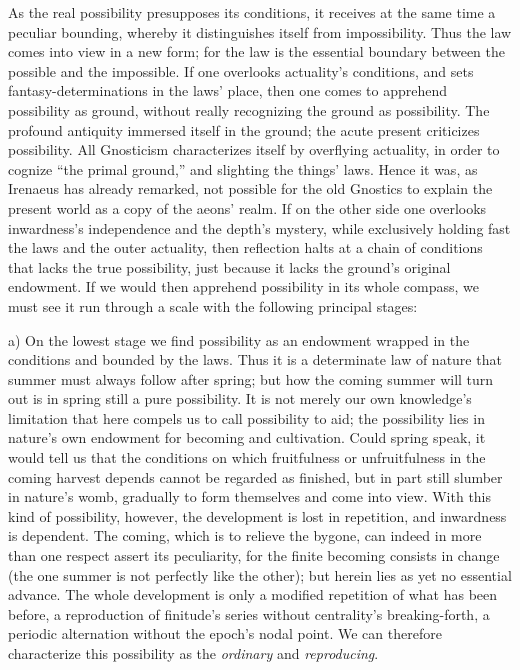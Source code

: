\documentclass[12pt]{book}
\begin{document}
As the real possibility presupposes its conditions, it receives at the same
time a peculiar bounding, whereby it distinguishes itself from
impossibility. Thus the law comes into view in a new form; for the law is
the essential boundary between the possible and the impossible. If one
overlooks actuality's conditions, and sets fantasy-determinations in the
laws' place, then one comes to apprehend possibility as ground, without
really recognizing the ground as possibility. The profound antiquity
immersed itself in the ground; the acute present criticizes possibility. All
Gnosticism characterizes itself by overflying actuality, in order to cognize
``the primal ground,'' and slighting the things' laws. Hence it was, as
Irenaeus has already remarked, not possible for the old Gnostics to explain
the present world as a copy of the aeons' realm. If on the other side one
overlooks inwardness's independence and the depth's mystery, while
exclusively holding fast the laws and the outer actuality, then reflection
halts at a chain of conditions that lacks the true possibility, just because
it lacks the ground's original endowment. If we would then apprehend
possibility in its whole compass, we must see it run through a scale with
the following principal stages:

a) On the lowest stage we find possibility as an endowment wrapped in the
conditions and bounded by the laws. Thus it is a determinate law of nature
that summer must always follow after spring; but how the coming summer will
turn out is in spring still a pure possibility. It is not merely our own
knowledge's limitation that here compels us to call possibility to aid; the
possibility lies in nature's own endowment for becoming and cultivation.
Could spring speak, it would tell us that the conditions on which
fruitfulness or unfruitfulness in the coming harvest depends cannot be
regarded as finished, but in part still slumber in nature's womb, gradually
to form themselves and come into view. With this kind of possibility,
however, the development is lost in repetition, and inwardness is dependent.
The coming, which is to relieve the bygone, can indeed in more than one
respect assert its peculiarity, for the finite becoming consists in change
(the one summer is not perfectly like the other); but herein lies as yet no
essential advance. The whole development is only a modified repetition of
what has been before, a reproduction of finitude's series without
centrality's breaking-forth, a periodic alternation without the epoch's
nodal point. We can therefore characterize this possibility as the
\emph{ordinary} and \emph{reproducing}.
\end{document}
